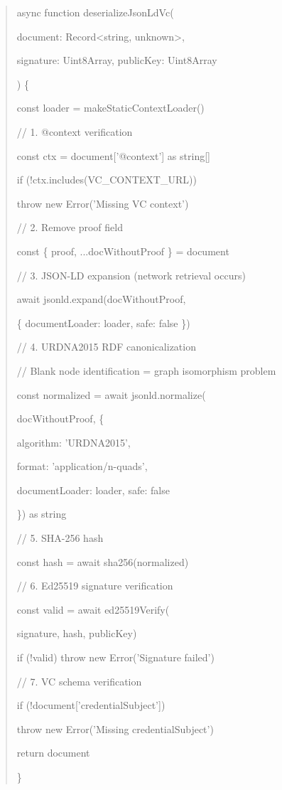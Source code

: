 \begin{quote}
async function deserializeJsonLdVc(

document: Record\textless string, unknown\textgreater,

signature: Uint8Array, publicKey: Uint8Array

) \{

const loader = makeStaticContextLoader()

// 1. @context verification

const ctx = document{[}'@context'{]} as string{[}{]}

if (!ctx.includes(VC\_CONTEXT\_URL))

throw new Error('Missing VC context')

// 2. Remove proof field

const \{ proof, ...docWithoutProof \} = document

// 3. JSON-LD expansion (network retrieval occurs)

await jsonld.expand(docWithoutProof,

\{ documentLoader: loader, safe: false \})

// 4. URDNA2015 RDF canonicalization

// Blank node identification = graph isomorphism problem

const normalized = await jsonld.normalize(

docWithoutProof, \{

algorithm: 'URDNA2015',

format: 'application/n-quads',

documentLoader: loader, safe: false

\}) as string

// 5. SHA-256 hash

const hash = await sha256(normalized)

// 6. Ed25519 signature verification

const valid = await ed25519Verify(

signature, hash, publicKey)

if (!valid) throw new Error('Signature failed')

// 7. VC schema verification

if (!document{[}'credentialSubject'{]})

throw new Error('Missing credentialSubject')

return document

\}
\end{quote}


